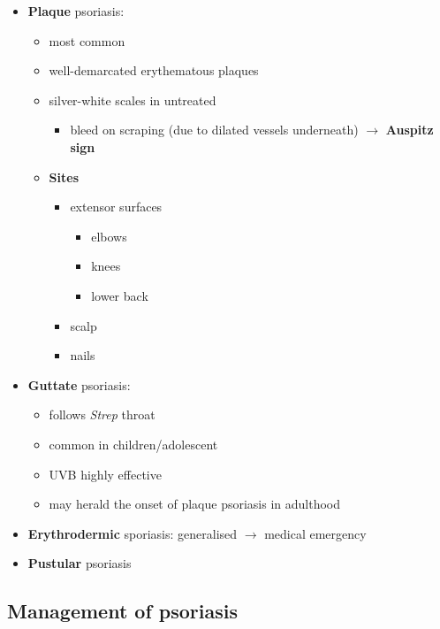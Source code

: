 \documentclass[
  12pt,
]{memoir}
\providecommand{\tightlist}{%
  \setlength{\itemsep}{0pt}\setlength{\parskip}{0pt}}
\begin{document}
\begin{itemize}
\tightlist
\item
  \textbf{Plaque} psoriasis:

  \begin{itemize}
  \tightlist
  \item
    most common
  \item
    well-demarcated erythematous plaques
  \item
    silver-white scales in untreated

    \begin{itemize}
    \tightlist
    \item
      bleed on scraping (due to dilated vessels underneath)
      \(\rightarrow\) \textbf{Auspitz sign}
    \end{itemize}
  \item
    \textbf{Sites}

    \begin{itemize}
    \tightlist
    \item
      extensor surfaces

      \begin{itemize}
      \tightlist
      \item
        elbows
      \item
        knees
      \item
        lower back
      \end{itemize}
    \item
      scalp
    \item
      nails
    \end{itemize}
  \end{itemize}
\item
  \textbf{Guttate} psoriasis:

  \begin{itemize}
  \tightlist
  \item
    follows \emph{Strep} throat
  \item
    common in children/adolescent
  \item
    UVB highly effective
  \item
    may herald the onset of plaque psoriasis in adulthood
  \end{itemize}
\item
  \textbf{Erythrodermic} sporiasis: generalised \(\rightarrow\) medical
  emergency
\item
  \textbf{Pustular} psoriasis
\end{itemize}

\hypertarget{management-of-psoriasis}{%
\subsection{Management of psoriasis}\label{management-of-psoriasis}}
\end{document}
